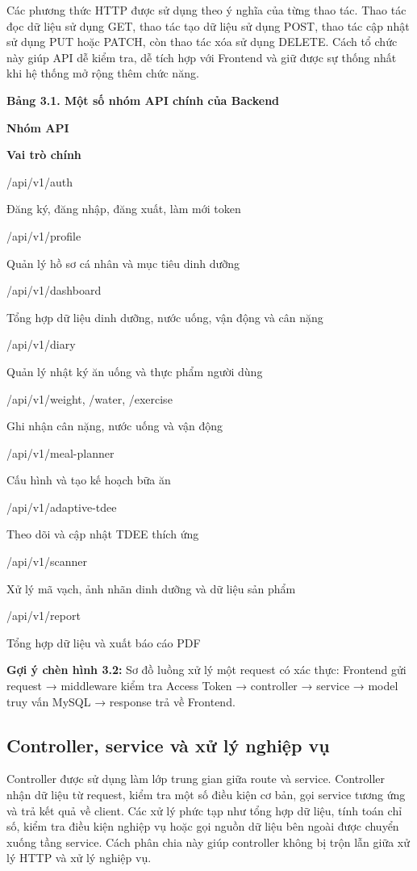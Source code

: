 \documentclass[12pt, a4paper]{report}
\begin{document}
Các phương thức HTTP được sử dụng theo ý nghĩa của từng thao tác. Thao tác đọc dữ liệu sử dụng GET, thao tác tạo dữ liệu sử dụng POST, thao tác cập nhật sử dụng PUT hoặc PATCH, còn thao tác xóa sử dụng DELETE. Cách tổ chức này giúp API dễ kiểm tra, dễ tích hợp với Frontend và giữ được sự thống nhất khi hệ thống mở rộng thêm chức năng.

\textbf{Bảng 3.1. Một số nhóm API chính của Backend}

\textbf{Nhóm API}

\textbf{Vai trò chính}

/api/v1/auth

Đăng ký, đăng nhập, đăng xuất, làm mới token

/api/v1/profile

Quản lý hồ sơ cá nhân và mục tiêu dinh dưỡng

/api/v1/dashboard

Tổng hợp dữ liệu dinh dưỡng, nước uống, vận động và cân nặng

/api/v1/diary

Quản lý nhật ký ăn uống và thực phẩm người dùng

/api/v1/weight, /water, /exercise

Ghi nhận cân nặng, nước uống và vận động

/api/v1/meal-planner

Cấu hình và tạo kế hoạch bữa ăn

/api/v1/adaptive-tdee

Theo dõi và cập nhật TDEE thích ứng

/api/v1/scanner

Xử lý mã vạch, ảnh nhãn dinh dưỡng và dữ liệu sản phẩm

/api/v1/report

Tổng hợp dữ liệu và xuất báo cáo PDF

\textbf{Gợi ý chèn hình 3.2:} Sơ đồ luồng xử lý một request có xác thực: Frontend gửi request → middleware kiểm tra Access Token → controller → service → model truy vấn MySQL → response trả về Frontend.

\subsection{Controller, service và xử lý nghiệp vụ}Controller được sử dụng làm lớp trung gian giữa route và service. Controller nhận dữ liệu từ request, kiểm tra một số điều kiện cơ bản, gọi service tương ứng và trả kết quả về client. Các xử lý phức tạp như tổng hợp dữ liệu, tính toán chỉ số, kiểm tra điều kiện nghiệp vụ hoặc gọi nguồn dữ liệu bên ngoài được chuyển xuống tầng service. Cách phân chia này giúp controller không bị trộn lẫn giữa xử lý HTTP và xử lý nghiệp vụ.
\end{document}
